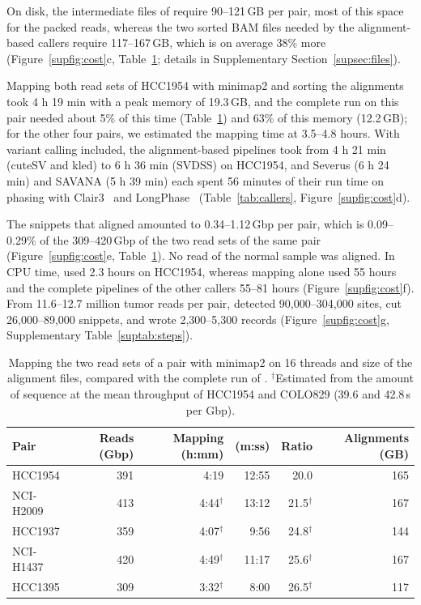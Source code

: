 {On disk, the intermediate files of \tool{} require 90--121\,GB per pair, most of this space for the packed reads, whereas the two sorted BAM files needed by the alignment-based callers require 117--167\,GB, which is on average 38\% more (Figure~\ref{supfig:cost}c, Table~\ref{suptab:mapping}; details in Supplementary Section~\ref{supsec:files}).

Mapping both read sets of HCC1954 with minimap2 and sorting the alignments took 4 h 19 min with a peak memory of 19.3\,GB, and the complete \tool{} run on this pair needed about 5\% of this time (Table~\ref{suptab:mapping}) and 63\% of this memory (12.2\,GB); for the other four pairs, we estimated the mapping time at 3.5--4.8 hours. With variant calling included, the alignment-based pipelines took from 4 h 21 min (cuteSV and kled) to 6 h 36 min (SVDSS) on HCC1954, and Severus (6 h 24 min) and SAVANA (5 h 39 min) each spent 56 minutes of their run time on phasing with Clair3~\cite{clair3} and LongPhase~\cite{longphase} (Table~\ref{tab:callers}, Figure~\ref{supfig:cost}d).

The snippets that \tool{} aligned amounted to 0.34--1.12\,Gbp per pair, which is 0.09--0.29\% of the 309--420\,Gbp of the two read sets of the same pair (Figure~\ref{supfig:cost}e, Table~\ref{suptab:mapping}). No read of the normal sample was aligned. In CPU time, \tool{} used 2.3 hours on HCC1954, whereas mapping alone used 55 hours and the complete pipelines of the other callers 55--81 hours (Figure~\ref{supfig:cost}f). From 11.6--12.7 million tumor reads per pair, \tool{} detected 90,000--304,000 sites, cut 26,000--89,000 snippets, and wrote 2,300--5,300 records (Figure~\ref{supfig:cost}g, Supplementary Table~\ref{suptab:steps}).

\begin{table}[tbp]
\centering
\begin{tabular}{lrrrrr}
\toprule
Pair & Reads (Gbp) & Mapping (h:mm) & \tool{} (m:ss) & Ratio & Alignments (GB) \\
\midrule
HCC1954   & 391 & 4:19 & 12:55 & 20.0 & 165 \\
NCI-H2009 & 413 & 4:44$^\dagger$ & 13:12 & 21.5$^\dagger$ & 167 \\
HCC1937   & 359 & 4:07$^\dagger$ & 9:56 & 24.8$^\dagger$ & 144 \\
NCI-H1437 & 420 & 4:49$^\dagger$ & 11:17 & 25.6$^\dagger$ & 167 \\
HCC1395   & 309 & 3:32$^\dagger$ & 8:00 & 26.5$^\dagger$ & 117 \\
\bottomrule
\end{tabular}
\caption{Mapping the two read sets of a pair with minimap2 on 16 threads and size of the alignment files, compared with the complete run of \tool{}. $^\dagger$Estimated from the amount of sequence at the mean throughput of HCC1954 and COLO829 (39.6 and 42.8\,s per Gbp).}
\label{suptab:mapping}
\end{table}

}
